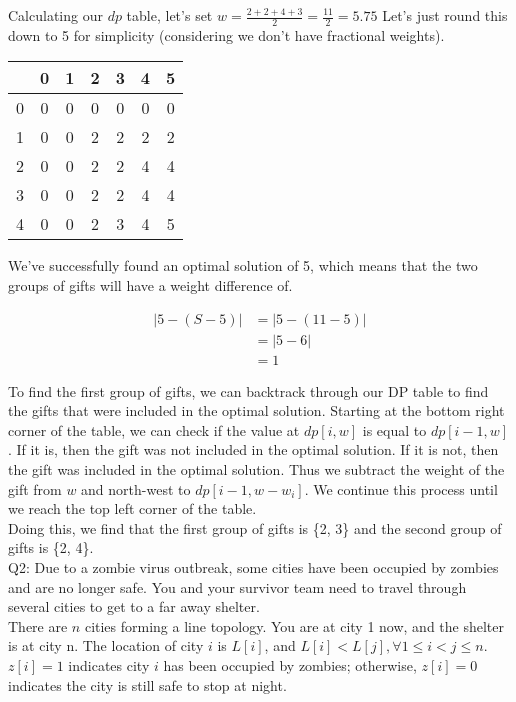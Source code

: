 \documentclass[a4paper,12pt]{article}
\begin{document}
Calculating our \(dp\) table, let's set \(w = \frac{2+2+4+3}{2} = \frac{11}{2} = 5.75\)
Let's just round this down to 5 for simplicity (considering we don't have fractional weights). \\[1em]
\begin{center}
  \begin{tabular}{ c | c c c c c c }
      & 0 & 1 & 2 & 3 & 4 & 5 \\
    \hline
    0 & 0 & 0 & 0 & 0 & 0 & 0 \\
    1 & 0 & 0 & 2 & 2 & 2 & 2 \\
    2 & 0 & 0 & 2 & 2 & 4 & 4 \\
    3 & 0 & 0 & 2 & 2 & 4 & 4 \\
    4 & 0 & 0 & 2 & 3 & 4 & 5 \\
  \end{tabular}
\end{center}

We've successfully found an optimal solution of 5, which means that the two
groups of gifts will have a weight difference of.

\begin{align*}
  |5 - (S - 5)| & = |5 - (11 - 5)| \\
                & = |5 - 6|        \\
                & = 1
\end{align*}

To find the first group of gifts, we can backtrack through our DP table to find
the gifts that were included in the optimal solution. Starting at the bottom
right corner of the table, we can check if the value at \(dp[i, w]\) is equal to
\(dp[i - 1, w]\). If it is, then the gift was not included in the optimal
solution. If it is not, then the gift was included in the optimal solution. Thus
we subtract the weight of the gift from \(w\) and north-west to \(dp[i - 1, w -
    w_i]\). We continue this process until we reach the top left corner of the
table. \\[1em]

Doing this, we find that the first group of gifts is \{2, 3\} and the second group
of gifts is \{2, 4\}. \\[1em]

\newpage
\noindent Q2: Due to a zombie virus outbreak, some cities have been occupied by
zombies and are no longer safe. You and your survivor team need to travel
through several cities to get to a far away shelter. \\
There are $n$ cities forming a line topology. You are at city 1 now, and the
shelter is at city n. The location of city $i$ is $L[i]$, and $L[i] < L[j],
  \forall 1 \leq i < j \leq n$. $z[i] = 1$ indicates city $i$ has been occupied by
zombies; otherwise, $z[i] = 0$ indicates the city is still safe to stop at
night.
\end{document}
